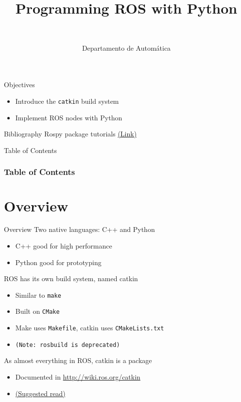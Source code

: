 \documentclass[10pt,compress]{beamer} %
\title[Programming ROS with Python]{Programming ROS with Python}
\author{\asignatura\\\carrera}
\institute{}
\date{Departamento de Automática}
\begin{document}
{\titlepageBlue
    \begin{frame}
        \titlepage
    \end{frame}
}

\institute{\asignatura}

\begin{frame}[plain]{}
   \begin{block}{Objectives}
       \begin{itemize}
	   	\item Introduce the \texttt{catkin} build system
       	\item Implement ROS nodes with Python
       \end{itemize}
   \end{block}

   \begin{block}{Bibliography}
       Rospy package tutorials \href{http://wiki.ros.org/rospy/Tutorials}{(Link)}
   \end{block}

\end{frame}

{
\begin{frame}[shrink]{Table of Contents}
 \frametitle{Table of Contents}
 \tableofcontents
\end{frame}
}

\section{Overview}

\begin{frame}{Overview}
	Two native languages: C++ and Python
	\begin{itemize}
		\item C++ good for high performance
		\item Python good for prototyping
  	\end{itemize}
	ROS has its own build system, named \alert{catkin}
	\begin{itemize}
		\item Similar to \texttt{make}
		\item Built on \texttt{CMake}
		\item Make uses \texttt{Makefile}, catkin uses \texttt{CMakeLists.txt}
		\item[] \texttt{(Note: \texttt{rosbuild} is deprecated)}
  	\end{itemize}
	As almost everything in ROS, catkin is a package
	\begin{itemize}
		\item Documented in \url{http://wiki.ros.org/catkin}
		\item \href{http://wiki.ros.org/catkin/conceptual\_overview}{(Suggested read)}
	\end{itemize}
\end{frame}
\end{document}
